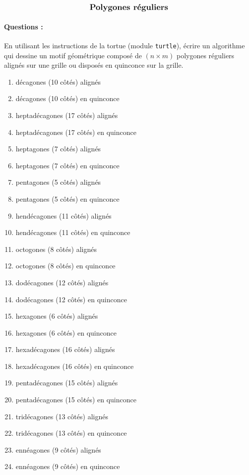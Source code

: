 \documentclass[11pt,a4paper,colorlinks,breaklinks]{article}
\begin{document}
\entete

\autoevaluation


$$\mbox{\textbf{\large Polygones réguliers}}$$


\paragraph{Questions :} 
En utilisant les instructions de la tortue \logo{}
(module \texttt{turtle}), écrire un algorithme qui dessine un motif géométrique
composé de $(n\times m)$ polygones réguliers alignés sur une grille
ou disposés en quinconce sur la grille.
\vspace*{3mm}

\begin{minipage}[t]{7cm}
\begin{enumerate}
\item décagones (10 côtés) alignés
\item décagones (10 côtés) en quinconce
\item heptadécagones (17 côtés) alignés
\item heptadécagones (17 côtés) en quinconce
\item heptagones (7 côtés) alignés
\item heptagones (7 côtés) en quinconce
\item pentagones (5 côtés) alignés
\item pentagones (5 côtés) en quinconce
\item hendécagones (11 côtés) alignés
\item hendécagones (11 côtés) en quinconce
\item octogones (8 côtés) alignés
\item octogones (8 côtés) en quinconce
\end{enumerate}
\end{minipage}
\hfill
\begin{minipage}[t]{7cm}
\begin{enumerate}\setcounter{enumi}{12}
\item dodécagones (12 côtés) alignés
\item dodécagones (12 côtés) en quinconce
\item hexagones (6 côtés) alignés
\item hexagones (6 côtés)  en quinconce
\item hexadécagones (16 côtés) alignés
\item hexadécagones (16 côtés) en quinconce
\item pentadécagones (15 côtés) alignés
\item pentadécagones (15 côtés) en quinconce
\item tridécagones (13 côtés) alignés
\item tridécagones (13 côtés) en quinconce
\item ennéagones (9 côtés) alignés
\item ennéagones (9 côtés) en quinconce
\end{enumerate}
\end{minipage}
\null\vfill
\end{document}
